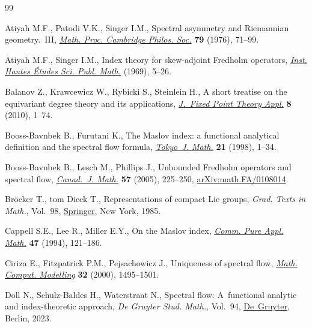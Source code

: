 \documentclass[pdftex]{sigma}
\numberwithin{equation}{section}
\theoremstyle{definition}
\begin{document}
\begin{thebibliography}{99}
\footnotesize\itemsep=0pt

Atiyah M.F., Patodi V.K., Singer I.M., Spectral asymmetry and {R}iemannian
 geometry.~{III},
 \href{https://doi.org/10.1017/S0305004100052105}{\textit{Math. Proc.
 Cambridge Philos. Soc.}} \textbf{79} (1976), 71--99.

Atiyah M.F., Singer I.M., Index theory for skew-adjoint {F}redholm operators,
 \href{https://doi.org/10.1007/BF02684885}{\textit{Inst. Hautes \'{E}tudes
 Sci. Publ. Math.}} (1969), 5--26.

Balanov Z., Krawcewicz W., Rybicki S., Steinlein H., A short treatise on the
 equivariant degree theory and its applications,
 \href{https://doi.org/10.1007/s11784-010-0033-9}{\textit{J.~Fixed Point
 Theory Appl.}} \textbf{8} (2010), 1--74.

Booss-Bavnbek B., Furutani K., The {M}aslov index: a functional analytical
 definition and the spectral flow formula,
 \href{https://doi.org/10.3836/tjm/1270041982}{\textit{Tokyo~J. Math.}}
 \textbf{21} (1998), 1--34.

Booss-Bavnbek B., Lesch M., Phillips J., Unbounded {F}redholm operators and
 spectral flow,
 \href{https://doi.org/10.4153/CJM-2005-010-1}{\textit{Canad.~J. Math.}}
 \textbf{57} (2005), 225--250,
 \href{http://arxiv.org/abs/math.FA/0108014}{arXiv:math.FA/0108014}.

Br\"{o}cker T., tom Dieck T., Representations of compact {L}ie groups,
 \textit{Grad. Texts in Math.}, Vol.~98,
 \href{https://doi.org/10.1007/978-3-662-12918-0}{Springer}, New York, 1985.

Cappell S.E., Lee R., Miller E.Y., On the {M}aslov index,
 \href{https://doi.org/10.1002/cpa.3160470202}{\textit{Comm. Pure Appl.
 Math.}} \textbf{47} (1994), 121--186.

Ciriza E., Fitzpatrick P.M., Pejsachowicz J., Uniqueness of spectral flow,
 \href{https://doi.org/10.1016/S0895-7177(00)00221-1}{\textit{Math. Comput.
 Modelling}} \textbf{32} (2000), 1495--1501.

Doll N., Schulz-Baldes H., Waterstraat N., Spectral flow: {A}~functional
 analytic and index-theoretic approach, \textit{De Gruyter Stud. Math.}, Vol.~94,
 \href{https://doi.org/10.1515/9783111172477}{De~Gruyter}, Berlin, 2023.


\end{thebibliography}
\end{document}
